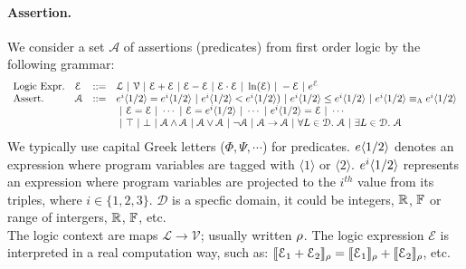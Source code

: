 \documentclass[a4paper,11pt]{article}
\begin{document}
\paragraph{Assertion.} We consider a set $\mathcal{A}$ of assertions (predicates) from first order logic by the following grammar:
\[
\begin{array}{llll}
%
%
\mbox{Logic Expr.} & \mathcal{E} & ::= & \mathcal{L}
	~|~ \mathcal{V}
 	~|~ \mathcal{E} + \mathcal{E}
 ~|~ \mathcal{E} - \mathcal{E}
 ~|~ \mathcal{E} \cdot \mathcal{E}
 ~|~ \ln(\mathcal{E}) ~|~ -\mathcal{E} ~|~ e^{\mathcal{E}}
	\\
%
\mbox{Assert.} & \mathcal{A} & ::= & 
\expr^{i} \langle 1 / 2 \rangle = \expr^i\langle 1 / 2 \rangle 
 ~|~ \expr^i\langle 1 / 2 \rangle < \expr^i\langle 1 / 2 \rangle) 
 ~|~ \expr^i\langle 1 / 2 \rangle \leq \expr^i\langle 1 / 2 \rangle
 ~|~ \expr^i\langle 1 / 2 \rangle \lameq \expr^i\langle 1 / 2 \rangle
	\\
 & & &
~|~  \mathcal{E} = \mathcal{E} ~|~ \cdots
~|~ \mathcal{E} =  \expr^{i} \langle 1 / 2 \rangle ~|~ \cdots
~|~ \expr^{i} \langle 1 / 2 \rangle =  \mathcal{E} ~|~ \cdots
	\\
 & & &
~|~  \top ~|~ \bot
	~|~ \mathcal{A} \land \mathcal{A} ~|~ \mathcal{A} \lor \mathcal{A} ~|~ \neg \mathcal{A}
	~|~ \mathcal{A} \imply \mathcal{A}
	~|~ \forall L \in \mathcal{D}. ~ \mathcal{A}
	~|~ \exists L \in \mathcal{D}. ~ \mathcal{A}
\end{array}
\]
%
We typically use capital Greek letters ($\Phi, \Psi, \cdots$) for predicates. 
%
$e\langle 1 / 2 \rangle$ denotes an expression where program variables are tagged with $\langle 1 \rangle$ or $\langle 2 \rangle$.
%
$e^i\langle 1 / 2 \rangle$ represents an expression where program variables are projected to the $i^{th}$ value from its triples, where $i \in \{1, 2, 3\}$. $\mathcal{D}$ is a specfic domain, it could be integers, $\mathbb{R}$, $\mathbb{F}$ or range of intergers, $\mathbb{R}$, $\mathbb{F}$, etc.
\\
The logic context are maps $\mathcal{L} \to \mathcal{V}$; usually written $\mathtt{\rho}$. The logic expression $\mathcal{E}$ is interpreted in a real computation way, such as:
%
$\llbracket \mathcal{E}_1 + \mathcal{E}_2 \rrbracket_{\mathtt{\rho}} = \llbracket \mathcal{E}_1 \rrbracket_{\mathtt{\rho}} + \llbracket \mathcal{E}_2 \rrbracket_{\mathtt{\rho}}$, etc.
%
%
\end{document}
